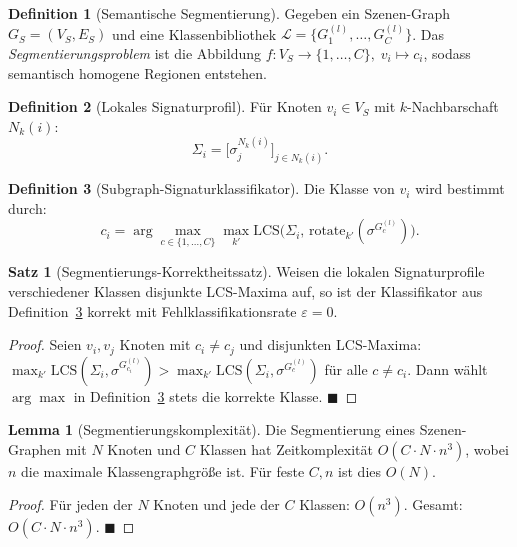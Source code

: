 ﻿\documentclass[a4paper,12pt]{article}
\theoremstyle{definition}
\newtheorem{definition}{Definition}[section]
\newtheorem{satz}{Satz}[section]
\newtheorem{lemma}{Lemma}[section]
\begin{document}
\begin{definition}[Semantische Segmentierung]
  \label{def:segmentierung}
  Gegeben ein Szenen-Graph $G_S = (V_S, E_S)$ und eine
  Klassenbibliothek $\mathcal{L} = \{G_1^{(l)}, \ldots, G_C^{(l)}\}$.
  Das \emph{Segmentierungsproblem} ist die Abbildung
  $f: V_S \to \{1,\ldots,C\},\; v_i \mapsto c_i$,
  sodass semantisch homogene Regionen entstehen.
\end{definition}

\begin{definition}[Lokales Signaturprofil]
  \label{def:sig_profil}
  Für Knoten $v_i \in V_S$ mit $k$-Nachbarschaft $N_k(i)$:
  \[
    \Sigma_i = \bigl[\sigma_j^{N_k(i)}\bigr]_{j \in N_k(i)}.
  \]
\end{definition}

\begin{definition}[Subgraph-Signaturklassifikator]
  \label{def:sig_klassifikator}
  Die Klasse von $v_i$ wird bestimmt durch:
  \[
    c_i = \arg\max_{c \in \{1,\ldots,C\}} \max_{k'}
          \mathrm{LCS}\!\bigl(\Sigma_i,\,
          \mathrm{rotate}_{k'}(\sigma^{G_c^{(l)}})\bigr).
  \]
\end{definition}

\begin{satz}[Segmentierungs-Korrektheitssatz]
  \label{satz:segmentierung}
  Weisen die lokalen Signaturprofile verschiedener Klassen
  disjunkte LCS-Maxima auf, so ist der Klassifikator aus
  Definition~\ref{def:sig_klassifikator} korrekt mit
  Fehlklassifikationsrate $\varepsilon = 0$.
\end{satz}

\begin{proof}
  Seien $v_i, v_j$ Knoten mit $c_i \neq c_j$ und disjunkten
  LCS-Maxima: $\max_{k'} \mathrm{LCS}(\Sigma_i,
  \sigma^{G_{c_i}^{(l)}}) > \max_{k'} \mathrm{LCS}(\Sigma_i,
  \sigma^{G_c^{(l)}})$ für alle $c \neq c_i$. Dann wählt $\arg\max$
  in Definition~\ref{def:sig_klassifikator} stets die korrekte
  Klasse. \hfill$\blacksquare$
\end{proof}

\begin{lemma}[Segmentierungskomplexität]
  \label{lem:seg_komplexitaet}
  Die Segmentierung eines Szenen-Graphen mit $N$ Knoten und $C$
  Klassen hat Zeitkomplexität $O(C \cdot N \cdot n^3)$, wobei $n$
  die maximale Klassengraphgröße ist. Für feste $C, n$ ist dies
  $O(N)$.
\end{lemma}

\begin{proof}
  Für jeden der $N$ Knoten und jede der $C$ Klassen: $O(n^3)$.
  Gesamt: $O(C \cdot N \cdot n^3)$. \hfill$\blacksquare$
\end{proof}
\end{document}
